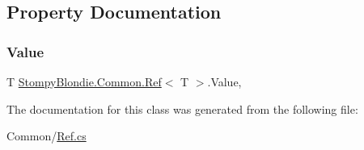 \subsection{Property Documentation}
\mbox{\label{class_stompy_blondie_1_1_common_1_1_ref_affb9fdf7ad5b2ccb82519015357364a1}} 
\subsubsection{\texorpdfstring{Value}{Value}}
{\footnotesize\ttfamily T \mbox{\hyperlink{class_stompy_blondie_1_1_common_1_1_ref}{Stompy\+Blondie.\+Common.\+Ref}}$<$ T $>$.Value\hspace{0.3cm}{\ttfamily [get]}, {\ttfamily [set]}}



The documentation for this class was generated from the following file\+:\begin{DoxyCompactItemize}
\item 
Common/\mbox{\hyperlink{_ref_8cs}{Ref.\+cs}}\end{DoxyCompactItemize}
